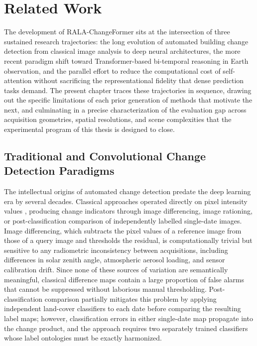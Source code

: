 \chapter{Related Work}
\label{chap:related_work}

The development of RALA-ChangeFormer sits at the intersection of three sustained research trajectories: the long evolution of automated building change detection from classical image analysis to deep neural architectures, the more recent paradigm shift toward Transformer-based bi-temporal reasoning in Earth observation, and the parallel effort to reduce the computational cost of self-attention without sacrificing the representational fidelity that dense prediction tasks demand. The present chapter traces these trajectories in sequence, drawing out the specific limitations of each prior generation of methods that motivate the next, and culminating in a precise characterization of the evaluation gap across acquisition geometries, spatial resolutions, and scene complexities that the experimental program of this thesis is designed to close.


\section{Traditional and Convolutional Change Detection Paradigms}
\label{sec:supervised-bcd}

The intellectual origins of automated change detection predate the deep learning era by several decades. Classical approaches operated directly on pixel intensity values \cite{Hussain2013Review}, producing change indicators through image differencing, image rationing, or post-classification comparison of independently labelled single-date images. Image differencing, which subtracts the pixel values of a reference image from those of a query image and thresholds the residual, is computationally trivial but sensitive to any radiometric inconsistency between acquisitions, including differences in solar zenith angle, atmospheric aerosol loading, and sensor calibration drift. Since none of these sources of variation are semantically meaningful, classical difference maps contain a large proportion of false alarms that cannot be suppressed without laborious manual thresholding. Post-classification comparison partially mitigates this problem by applying independent land-cover classifiers to each date before comparing the resulting label maps; however, classification errors in either single-date map propagate into the change product, and the approach requires two separately trained classifiers whose label ontologies must be exactly harmonized.

